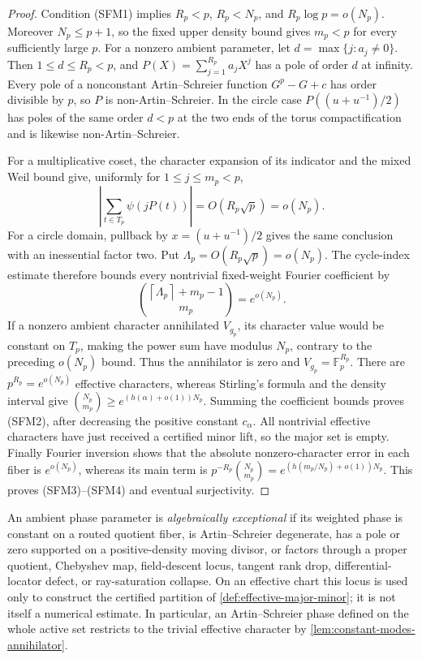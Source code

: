 \documentclass[11pt,a4paper]{amsart}
\numberwithin{equation}{section}
\theoremstyle{remark}
\newcommand{\F}{\mathbb F}\newcommand{\B}{\mathbb B}\newcommand{\K}{\mathbb K}\newcommand{\Z}{\mathbb Z}
\newcommand{\ceil}[1]{\left\lceil #1\right\rceil}\newcommand{\defeq}{\coloneqq}
\begin{document}
\begin{proof}
Condition \textup{(SFM1)} implies \(R_p<p\), \(R_p<N_p\), and
\(R_p\log p=o(N_p)\).  Moreover \(N_p\le p+1\), so the fixed upper
density bound gives \(m_p<p\) for every sufficiently large \(p\).
For a nonzero ambient parameter, let
\(d=\max\{j:a_j\ne0\}\).  Then \(1\le d\le R_p<p\), and
\(P(X)=\sum_{j=1}^{R_p}a_jX^j\) has a pole of order \(d\) at infinity.
Every pole of a nonconstant Artin--Schreier function \(G^p-G+c\) has
order divisible by \(p\), so \(P\) is non-Artin--Schreier.  In the circle
case \(P((u+u^{-1})/2)\) has poles of the same order \(d<p\) at the two
ends of the torus compactification and is likewise non-Artin--Schreier.

For a multiplicative coset, the character expansion of its indicator and
the mixed Weil bound give, uniformly for \(1\le j\le m_p<p\),
\[
 \left|\sum_{t\in T_p}\psi(jP(t))\right|=O(R_p\sqrt p)=o(N_p).
\]
For a circle domain, pullback by
\(x=(u+u^{-1})/2\) gives the same conclusion with an inessential factor
two.  Put \(\Lambda_p=O(R_p\sqrt p)=o(N_p)\).  The cycle-index estimate
therefore bounds every nontrivial fixed-weight Fourier coefficient by
\[
 \binom{\ceil{\Lambda_p}+m_p-1}{m_p}=e^{o(N_p)}.
\]
If a nonzero ambient character annihilated \(V_{g_p}\), its character
value would be constant on \(T_p\), making the power sum have modulus
\(N_p\), contrary to the preceding \(o(N_p)\) bound.  Thus the
annihilator is zero and \(V_{g_p}=\F_p^{R_p}\).  There are
\(p^{R_p}=e^{o(N_p)}\) effective characters, whereas
Stirling's formula and the density interval give
\(\binom{N_p}{m_p}\ge
e^{(h(\alpha)+o(1))N_p}\).  Summing the coefficient bounds proves
\textup{(SFM2)}, after decreasing the positive constant
\(c_\alpha\).  All nontrivial effective characters have just received a
certified minor lift, so the major set is empty.  Finally
Fourier inversion shows that the absolute nonzero-character error in each
fiber is \(e^{o(N_p)}\), whereas its main term is
\(p^{-R_p}\binom{N_p}{m_p}=e^{(h(m_p/N_p)+o(1))N_p}\).
This proves \textup{(SFM3)}--\textup{(SFM4)} and eventual surjectivity.
\end{proof}

\begin{definition}\label{def:major-arc}
An ambient phase parameter is \emph{algebraically exceptional} if its
weighted phase is constant on a routed quotient fiber, is Artin--Schreier
degenerate, has a pole or zero supported on a positive-density moving
divisor, or factors through a proper quotient, Chebyshev map,
field-descent locus, tangent rank drop, differential-locator defect, or
ray-saturation collapse.  On an effective chart this locus is used only
to construct the certified partition of
\cref{def:effective-major-minor}; it is not itself a numerical estimate.
In particular, an Artin--Schreier phase defined on the whole active set
restricts to the trivial effective character by
\cref{lem:constant-modes-annihilator}.
\end{definition}
\end{document}

